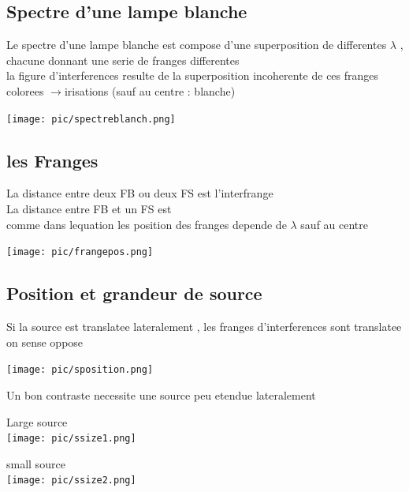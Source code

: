 \documentclass[12pt]{book}
\begin{document}
            \subsection{Spectre d'une lampe blanche}
                \begin{minipage}{0.49\linewidth}
                    Le spectre d'une lampe blanche est compose d'une superposition de differentes $\lambda$ , chacune donnant une serie de franges differentes \\
                    la figure d'interferences resulte de la superposition incoherente de ces franges colorees $\to $irisations (sauf au centre : blanche)
                \end{minipage}
                \begin{minipage}{0.49\linewidth}
                    \texttt{[image: pic/spectreblanch.png]}
                \end{minipage}
            \subsection{les Franges}
                \begin{minipage}{0.8\linewidth}
                    La distance entre deux FB ou deux FS est l'interfrange  \\
                    La distance entre FB et un FS est  \\
                    comme dans lequation les position des franges depende de $\lambda $ sauf au centre 
                \end{minipage}
                \begin{minipage}{0.2\linewidth}
                    \texttt{[image: pic/frangepos.png]}
                \end{minipage}
            \subsection{Position et grandeur de source}
                \begin{minipage}{0.6\linewidth}
                   Si la source est translatee lateralement , les franges d'interferences sont translatee on sense oppose
                \end{minipage}
                \begin{minipage}{0.4\linewidth}
                    \texttt{[image: pic/sposition.png]}
                \end{minipage} 
                \pagebreak
                Un bon contraste necessite une source peu etendue lateralement \\
                    \begin{minipage}{0.45\linewidth}
                        Large source\\
                        \texttt{[image: pic/ssize1.png]}
                    \end{minipage}
                    \begin{minipage}{0.54\linewidth}
                        small source\\
                        \texttt{[image: pic/ssize2.png]}
                    \end{minipage}
\end{document}
